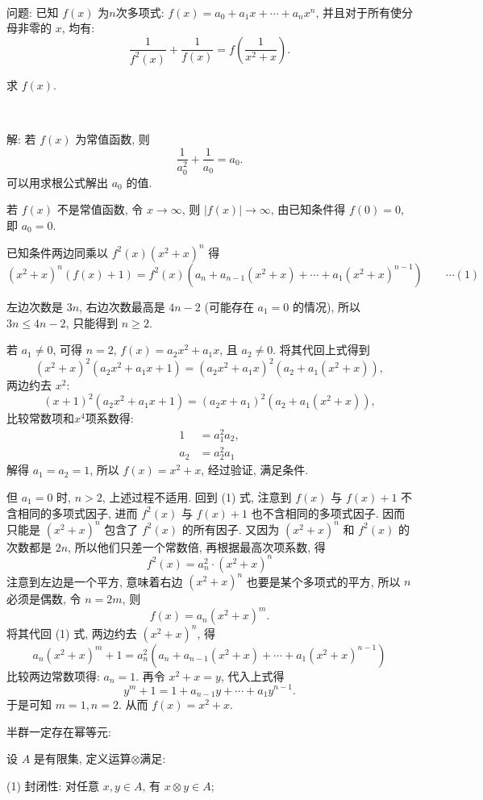 ~

问题: 已知 $f(x)$ 为$n$次多项式: $f(x) = a_0 + a_1x + \cdots + a_nx^n$, 并且对于所有使分母非零的 $x$, 均有:
\[ \frac{1}{f^2(x)} + \frac{1}{f(x)} = f(\frac{1}{x^2+x}) .\]

求 $f(x)$.

~

解: 若 $f(x)$ 为常值函数, 则
\[\frac{1}{a_0^2} + \frac{1}{a_0} = a_0 .\]
可以用求根公式解出 $a_0$ 的值.

若 $f(x)$ 不是常值函数, 令 $x\to\infty$, 则 $|f(x)|\to\infty$, 由已知条件得 $f(0) = 0$, 即 $a_0 = 0$.

已知条件两边同乘以 $f^2(x)(x^2+x)^n$ 得
\[ (x^2+x)^n (f(x)+1) = f^2(x)(a_n + a_{n-1}(x^2+x) + \cdots + a_1(x^2+x)^{n-1}) \qquad\cdots (1)\]

左边次数是 $3n$, 右边次数最高是 $4n-2$ (可能存在 $a_1=0$ 的情况),
所以 $3n\le 4n-2$, 只能得到 $n\ge 2$. 

若 $a_1\neq 0$, 可得 $n=2$, $f(x) = a_2x^2 + a_1x$, 且 $a_2\neq 0$. 将其代回上式得到
\[(x^2+x)^2(a_2x^2+a_1x+1) = (a_2x^2+a_1x)^2(a_2+a_1(x^2+x)) ,\]
两边约去 $x^2$:
\[ (x+1)^2(a_2x^2+a_1x+1) = (a_2x+a_1)^2(a_2+a_1(x^2+x)), \]
比较常数项和$x^4$项系数得:
\begin{align*} 
1 &= a_1^2a_2 ,\\ 
a_2 &= a_2^2a_1 
\end{align*} 
解得 $a_1=a_2=1$, 所以 $f(x) = x^2+x$, 经过验证, 满足条件.

但 $a_1=0$ 时, $n > 2$, 上述过程不适用. 回到 (1) 式, 注意到 $f(x)$ 与 $f(x)+1$ 不含相同的多项式因子, 进而 $f^2(x)$ 与 $f(x)+1$ 也不含相同的多项式因子. 因而只能是 $(x^2+x)^n$ 包含了 $f^2(x)$ 的所有因子. 又因为 $(x^2+x)^n$ 和 $f^2(x)$ 的次数都是 $2n$, 所以他们只差一个常数倍, 再根据最高次项系数, 得
\[ f^2(x) = a_n^2\cdot(x^2+x)^n \]
注意到左边是一个平方, 意味着右边 $(x^2+x)^n$ 也要是某个多项式的平方, 所以 $n$ 必须是偶数, 令 $n=2m$, 则
\[f(x) = a_n(x^2+x)^m .\]
将其代回 (1) 式, 两边约去 $(x^2+x)^n$, 得
\[ a_n(x^2+x)^m + 1 = a_n^2(a_n + a_{n-1}(x^2+x) + \cdots + a_1(x^2+x)^{n-1}) \]
比较两边常数项得: $a_n=1$. 再令 $x^2+x = y$, 代入上式得
\[y^m+1 = 1+a_{n-1}y+\cdots + a_1y^{n-1} .\]
于是可知 $m=1, n=2$. 从而 $f(x) = x^2 + x$.

\newpage
\noindent 半群一定存在幂等元:

设 $A$ 是有限集, 定义运算$\otimes$满足:

(1) 封闭性: 对任意 $x,y\in A$, 有 $x\otimes y\in A$;


